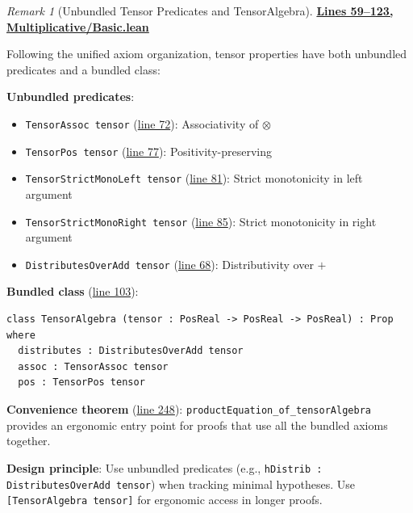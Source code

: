 \documentclass[11pt]{article}
\theoremstyle{definition}
\theoremstyle{remark}
\newtheorem{remark}[theorem]{Remark}
\begin{document}
\begin{remark}[Unbundled Tensor Predicates and TensorAlgebra]
\textbf{\href{https://github.com/zariuq/ks-foundations-of-inference/blob/main/KnuthSkilling/Multiplicative/Basic.lean\#L59-L123}{Lines 59--123, Multiplicative/Basic.lean}}

Following the unified axiom organization, tensor properties have both unbundled predicates and a bundled class:

\textbf{Unbundled predicates}:
\begin{itemize}
\item \texttt{TensorAssoc tensor} (\href{https://github.com/zariuq/ks-foundations-of-inference/blob/main/KnuthSkilling/Multiplicative/Basic.lean\#L72}{line 72}): Associativity of $\otimes$
\item \texttt{TensorPos tensor} (\href{https://github.com/zariuq/ks-foundations-of-inference/blob/main/KnuthSkilling/Multiplicative/Basic.lean\#L77}{line 77}): Positivity-preserving
\item \texttt{TensorStrictMonoLeft tensor} (\href{https://github.com/zariuq/ks-foundations-of-inference/blob/main/KnuthSkilling/Multiplicative/Basic.lean\#L81}{line 81}): Strict monotonicity in left argument
\item \texttt{TensorStrictMonoRight tensor} (\href{https://github.com/zariuq/ks-foundations-of-inference/blob/main/KnuthSkilling/Multiplicative/Basic.lean\#L85}{line 85}): Strict monotonicity in right argument
\item \texttt{DistributesOverAdd tensor} (\href{https://github.com/zariuq/ks-foundations-of-inference/blob/main/KnuthSkilling/Multiplicative/Basic.lean\#L68}{line 68}): Distributivity over $+$
\end{itemize}

\textbf{Bundled class} (\href{https://github.com/zariuq/ks-foundations-of-inference/blob/main/KnuthSkilling/Multiplicative/Basic.lean\#L103}{line 103}):
\begin{lstlisting}
class TensorAlgebra (tensor : PosReal -> PosReal -> PosReal) : Prop where
  distributes : DistributesOverAdd tensor
  assoc : TensorAssoc tensor
  pos : TensorPos tensor
\end{lstlisting}

\textbf{Convenience theorem} (\href{https://github.com/zariuq/ks-foundations-of-inference/blob/main/KnuthSkilling/Multiplicative/Basic.lean\#L248}{line 248}): \texttt{productEquation\_of\_tensorAlgebra} provides
an ergonomic entry point for proofs that use all the bundled axioms together.

\textbf{Design principle}: Use unbundled predicates (e.g., \texttt{hDistrib : DistributesOverAdd tensor})
when tracking minimal hypotheses. Use \texttt{[TensorAlgebra tensor]} for ergonomic access in longer proofs.
\end{remark}
\end{document}
